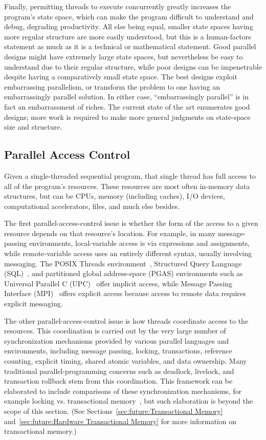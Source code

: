 Finally, permitting threads to execute concurrently greatly increases
the program's state space, which can make the program difficult to
understand and debug, degrading productivity.
All else being equal, smaller state spaces having more regular structure
are more easily understood, but this is a human-factors statement as much
as it is a technical or mathematical statement.
Good parallel designs might have extremely large state spaces, but
nevertheless be easy to understand due to their regular structure,
while poor designs can be impenetrable despite having a comparatively
small state space.
The best designs exploit embarrassing parallelism, or transform the
problem to one having an embarrassingly parallel solution.
In either case, ``embarrassingly parallel'' is in fact
an embarrassment of riches.
The current state of the art enumerates good designs; more work is
required to make more general judgments on
state-space size and structure.

\subsection{Parallel Access Control}
\label{sec:Parallel Access Control}

Given a single-threaded sequential program, that single
thread has full access to all of the program's resources.
These resources are most often in-memory data structures, but can be CPUs,
memory (including caches), I/O devices, computational accelerators, files,
and much else besides.

The first parallel-access-control issue is whether the form of the access to
a given resource depends on that resource's location.
For example, in many message-passing environments, local-variable
access is via expressions and assignments,
while remote-variable access uses an entirely different
syntax, usually involving messaging.
The POSIX Threads environment~\cite{OpenGroup1997pthreads},
Structured Query Language (SQL)~\cite{DIS9075SQL92}, and
partitioned global address-space (PGAS) environments
such as Universal Parallel C (UPC)~\cite{ElGhazawi2003UPC}
offer implicit access,
while Message Passing Interface (MPI)~\cite{MPIForum2008} offers
explicit access because access to remote data requires explicit
messaging.

The other parallel-access-control issue is how threads coordinate
access to the resources.
This coordination is carried out by
the very large number of synchronization mechanisms
provided by various parallel languages and environments,
including message passing, locking, transactions,
reference counting, explicit timing, shared atomic variables, and data
ownership.
Many traditional parallel-programming concerns such as deadlock,
livelock, and transaction rollback stem from this coordination.
This framework can be elaborated to include comparisons
of these synchronization mechanisms, for example locking vs. transactional
memory~\cite{McKenney2007PLOSTM}, but such elaboration is beyond the
scope of this section.
(See
Sections~\ref{sec:future:Transactional Memory}
and~\ref{sec:future:Hardware Transactional Memory}
for more information on transactional memory.)

